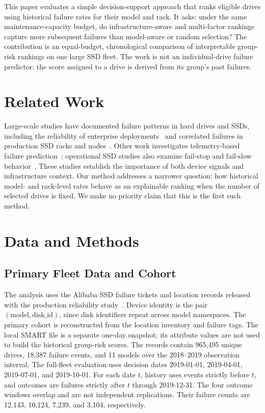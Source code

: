 \documentclass[conference]{IEEEtran}
\begin{document}
This paper evaluates a simple decision-support approach that ranks eligible drives
using historical failure rates for their model and rack. It asks: under the same
maintenance-capacity budget, do infrastructure-aware and multi-factor rankings capture
more subsequent failures than model-aware or random selection? The contribution is an
equal-budget, chronological comparison of interpretable group-risk rankings on one
large SSD fleet. The work is not an individual-drive failure predictor: the score
assigned to a drive is derived from its group's past failures.

\section{Related Work}
Large-scale studies have documented failure patterns in hard drives and SSDs, including
the reliability of enterprise deployments~\cite{pinheiro2007,maneas2020} and correlated
failures in production SSD racks and nodes~\cite{han2021}. Other work investigates
telemetry-based failure prediction~\cite{lu2020}; operational SSD studies also examine
fail-stop and fail-slow behavior~\cite{lu2022}. These studies establish the importance
of both device signals and infrastructure context. Our method addresses a narrower question:
how historical model- and rack-level rates behave as an explainable ranking when the
number of selected drives is fixed. We make no priority claim that this is the first
such method.

\section{Data and Methods}
\subsection{Primary Fleet Data and Cohort}
The analysis uses the Alibaba SSD failure tickets and location records released with
the production reliability study~\cite{han2021}. Device identity is the pair
$(\text{model},\text{disk\_id})$, since disk identifiers repeat across model namespaces.
The primary cohort is reconstructed from the location inventory and failure tags. The
local SMART file is a separate one-day snapshot; its attribute values are not used to
build the historical group-risk scores. The records contain 965,495 unique drives,
18,387 failure events, and 11 models over the 2018--2019 observation interval. The
full-fleet evaluation uses
decision dates 2019-01-01, 2019-04-01, 2019-07-01, and 2019-10-01. For each date $t$,
history uses events strictly before $t$, and outcomes are failures strictly after $t$
through 2019-12-31. The four outcome windows overlap and are not independent
replications. Their failure counts are 12,143, 10,124, 7,239, and 3,104, respectively.
\end{document}
